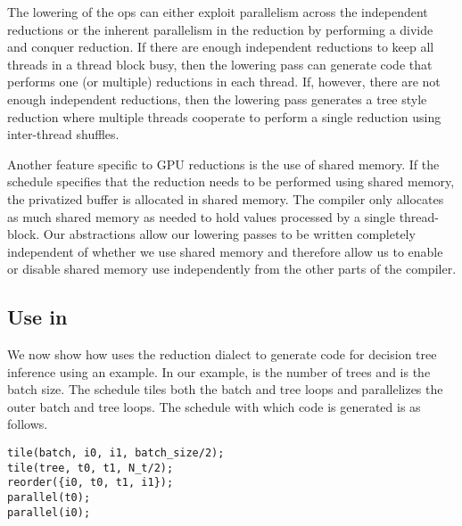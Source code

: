 The lowering of the  ops can either exploit
parallelism across the independent reductions or 
the inherent parallelism in the reduction by performing a divide and conquer 
reduction. If there are enough independent reductions to keep all threads
in a thread block busy, then the lowering pass can generate code that performs one (or 
multiple) reductions in each thread. If, however, there are not 
enough independent reductions, then the lowering pass generates a tree 
style reduction where multiple threads cooperate to perform a single reduction
using inter-thread shuffles.

Another feature specific to GPU reductions is the use of shared memory. 
If the schedule specifies that the reduction needs to be performed 
using shared memory, the privatized buffer is allocated in shared memory. 
The compiler only allocates as much shared memory 
as needed to hold values processed by a single thread-block.
Our abstractions allow our lowering passes to be written completely 
independent of whether we use shared memory and therefore allow 
us to enable or disable shared memory use independently from the other 
parts of the compiler. 

\subsection{Use in \Treebeard{}}
We now show how \Treebeard{} uses the reduction dialect to generate 
code for decision tree inference using an example. 
In our example,  is the number of trees 
and  is the batch size. The schedule tiles both the 
batch and tree loops and parallelizes the outer batch 
and tree loops. The schedule with which code is generated is as follows.

\begin{lstlisting}[style=c++]
tile(batch, i0, i1, batch_size/2);
tile(tree, t0, t1, N_t/2);
reorder({i0, t0, t1, i1});
parallel(t0);
parallel(i0);
\end{lstlisting}

